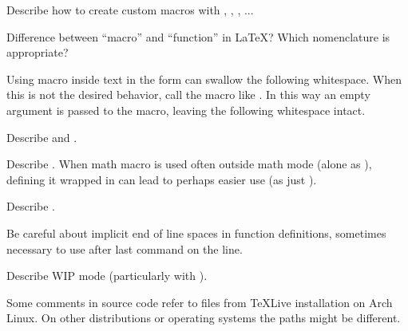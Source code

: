 \begin{Todo}
    Describe how to create custom macros with \macro{\NewDocumentCommand}, \macro{\RenewDocumentCommand}, \macro{\NewCommandCopy}, ...
\end{Todo}
\begin{Question}
    Difference between \enquote{macro} and \enquote{function} in \LaTeX{}?
    Which nomenclature is appropriate?
\end{Question}
\begin{remark}
    Using macro inside text in the form \macro{\foo} can swallow the following whitespace.
    When this is not the desired behavior, call the macro like \macro{\foo{}}.
    In this way an empty argument is passed to the macro, leaving the following whitespace intact.
\end{remark}
\begin{Todo}
    Describe \macro{\makeatletter} and \macro{\makeatother}.
\end{Todo}
\begin{Todo}
    Describe \macro{\ensuremath}.
    When math macro is used often outside math mode (alone as ), defining it wrapped in \macro{\ensuremath} can lead to perhaps easier use (as just ).
\end{Todo}
\begin{Todo}
    Describe .
\end{Todo}
\begin{Note}
    Be careful about implicit end of line spaces in function definitions, sometimes necessary to use \macrobox{\texttt{\%}} after last command on the line.
\end{Note}
\begin{Todo}
    Describe WIP mode (particularly with ).
\end{Todo}
\begin{Note}
    Some comments in source code refer to files from \TeX{}Live installation on Arch Linux.
    On other distributions or operating systems the paths might be different.
\end{Note}
